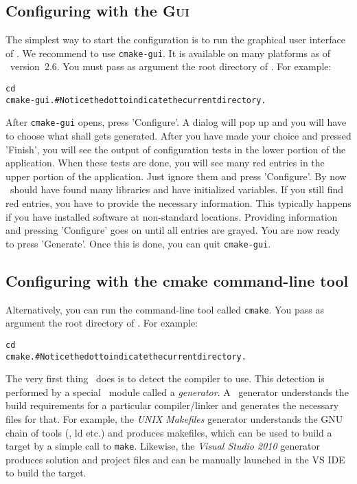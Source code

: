 \subsection{Configuring \cgal{} with the \cmake{} \textsc{Gui} }

The simplest way to start the configuration is to run the graphical
user interface of \cmake. We recommend to use \texttt{cmake-gui}. It
is available on many platforms as of \cmake\ version~2.6. You must pass as 
argument the root directory of \cgal. For example:

{\ccTexHtml{}{}
\begin{alltt}
  cd  \cgalrel
  cmake-gui . # Notice the dot to indicate the current directory.
\end{alltt}
}

After \texttt{cmake-gui} opens, press 'Configure'. 
A dialog will pop up and you will have to choose what shall gets generated.
After you have made your choice and pressed 'Finish', you will see
the output of configuration tests in the lower portion of the application. 
When these tests are done, you will see many
red entries in the upper portion of the application. Just ignore them and press 'Configure'. 
By now \cmake\ should have found many libraries and have initialized variables. 
If you still find red entries, you have to provide the necessary information. 
This typically happens if you have installed software at non-standard locations.
Providing information and pressing 'Configure' goes on until 
all entries are grayed. You are now ready to press 'Generate'. Once this is
done, you can quit \texttt{cmake-gui}.

\subsection{Configuring \cgal{} with the cmake command-line tool }

Alternatively, you can run the command-line tool called
\texttt{cmake}. You pass as argument the root directory of
\cgal. For example:

{\ccTexHtml{}{}
\begin{alltt}
  cd  \cgalrel
  cmake . # Notice the dot to indicate the current directory.
\end{alltt}
}

The very first thing \cmake\ does is to detect the compiler to use.  This
detection is performed by a special \cmake\ module called a
\emph{generator}. 
A \cmake\ generator understands the build requirements for a
particular compiler/linker and generates the necessary files for that. For
example, the \emph{UNIX Makefiles} generator understands the GNU chain
of tools (\gcc, ld etc.) and produces makefiles, which can be used to build a
target by a simple call to \texttt{make}.  Likewise, the \emph{Visual Studio
  2010} generator produces solution and project files and can be manually
launched in the VS IDE to build the target.

